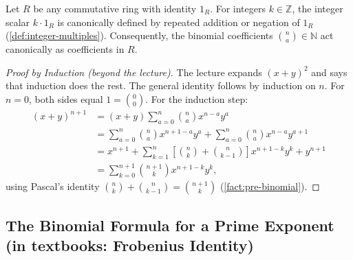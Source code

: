 \begin{content}
Let $R$ be any commutative ring with identity $1_R$. For integers $k \in \mathbb{Z}$, the integer scalar $k \cdot 1_R$ is canonically defined by repeated addition or negation of $1_R$ (\cref{def:integer-multiples}). Consequently, the binomial coefficients $\binom{n}{a} \in \mathbb{N}$ act canonically as coefficients in $R$.



\begin{proof}[Proof by Induction (beyond the lecture)]
The lecture expands $(x + y)^2$ and says that induction does the rest. The general identity follows by induction on $n$. For $n = 0$, both sides equal $1 = \binom{0}{0}$. For the induction step:
\begin{align*}
(x + y)^{n+1} &= (x + y) \sum_{a=0}^n \binom{n}{a} x^{n-a} y^a \\
&= \sum_{a=0}^n \binom{n}{a} x^{n+1-a} y^a + \sum_{a=0}^n \binom{n}{a} x^{n-a} y^{a+1} \\
&= x^{n+1} + \sum_{k=1}^n \left[ \binom{n}{k} + \binom{n}{k-1} \right] x^{n+1-k} y^k + y^{n+1} \\
&= \sum_{k=0}^{n+1} \binom{n+1}{k} x^{n+1-k} y^k,
\end{align*}
using Pascal's identity $\binom{n}{k} + \binom{n}{k-1} = \binom{n+1}{k}$ (\cref{fact:pre-binomial}).
\end{proof}
\end{content}

\subsection{The Binomial Formula for a Prime Exponent (in textbooks: Frobenius Identity)}


